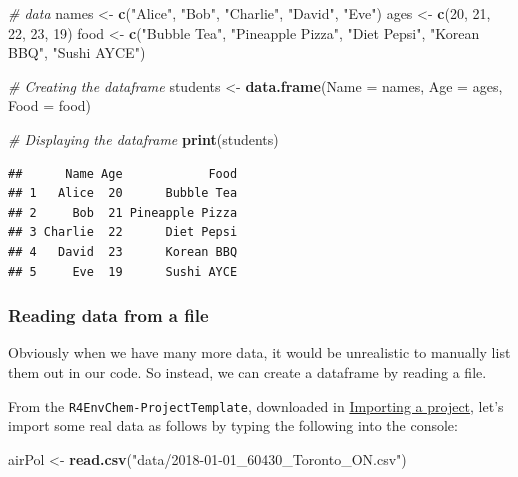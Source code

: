 \documentclass[
]{book}
\newenvironment{Shaded}{\begin{snugshade}}{\end{snugshade}}
\newcommand{\AttributeTok}[1]{\textcolor[rgb]{0.13,0.29,0.53}{#1}}
\newcommand{\CommentTok}[1]{\textcolor[rgb]{0.56,0.35,0.01}{\textit{#1}}}
\newcommand{\DecValTok}[1]{\textcolor[rgb]{0.00,0.00,0.81}{#1}}
\newcommand{\FunctionTok}[1]{\textcolor[rgb]{0.13,0.29,0.53}{\textbf{#1}}}
\newcommand{\NormalTok}[1]{#1}
\newcommand{\OtherTok}[1]{\textcolor[rgb]{0.56,0.35,0.01}{#1}}
\newcommand{\StringTok}[1]{\textcolor[rgb]{0.31,0.60,0.02}{#1}}
\begin{document}
\begin{Shaded}
\begin{Highlighting}[]
\CommentTok{\# data}
\NormalTok{names }\OtherTok{\textless{}{-}} \FunctionTok{c}\NormalTok{(}\StringTok{"Alice"}\NormalTok{, }\StringTok{"Bob"}\NormalTok{, }\StringTok{"Charlie"}\NormalTok{, }\StringTok{"David"}\NormalTok{, }\StringTok{"Eve"}\NormalTok{)}
\NormalTok{ages }\OtherTok{\textless{}{-}} \FunctionTok{c}\NormalTok{(}\DecValTok{20}\NormalTok{, }\DecValTok{21}\NormalTok{, }\DecValTok{22}\NormalTok{, }\DecValTok{23}\NormalTok{, }\DecValTok{19}\NormalTok{)}
\NormalTok{food }\OtherTok{\textless{}{-}} \FunctionTok{c}\NormalTok{(}\StringTok{"Bubble Tea"}\NormalTok{, }\StringTok{"Pineapple Pizza"}\NormalTok{, }\StringTok{"Diet Pepsi"}\NormalTok{, }\StringTok{"Korean BBQ"}\NormalTok{, }\StringTok{"Sushi AYCE"}\NormalTok{)}

\CommentTok{\# Creating the dataframe}
\NormalTok{students }\OtherTok{\textless{}{-}} \FunctionTok{data.frame}\NormalTok{(}\AttributeTok{Name =}\NormalTok{ names, }\AttributeTok{Age =}\NormalTok{ ages, }\AttributeTok{Food =}\NormalTok{ food)}

\CommentTok{\# Displaying the dataframe}
\FunctionTok{print}\NormalTok{(students)}
\end{Highlighting}
\end{Shaded}

\begin{verbatim}
##      Name Age            Food
## 1   Alice  20      Bubble Tea
## 2     Bob  21 Pineapple Pizza
## 3 Charlie  22      Diet Pepsi
## 4   David  23      Korean BBQ
## 5     Eve  19      Sushi AYCE
\end{verbatim}

\hypertarget{reading-data-from-a-file}{%
\subsubsection{Reading data from a file}\label{reading-data-from-a-file}}

Obviously when we have many more data, it would be unrealistic to manually list them out in our code. So instead, we can create a dataframe by reading a file.

From the \texttt{R4EnvChem-ProjectTemplate}, downloaded in \protect\hyperlink{importing-a-project}{Importing a project}, let's import some real data as follows by typing the following into the console:

\begin{Shaded}
\begin{Highlighting}[]
\NormalTok{airPol }\OtherTok{\textless{}{-}} \FunctionTok{read.csv}\NormalTok{(}\StringTok{"data/2018{-}01{-}01\_60430\_Toronto\_ON.csv"}\NormalTok{)}
\end{Highlighting}
\end{Shaded}
\end{document}
